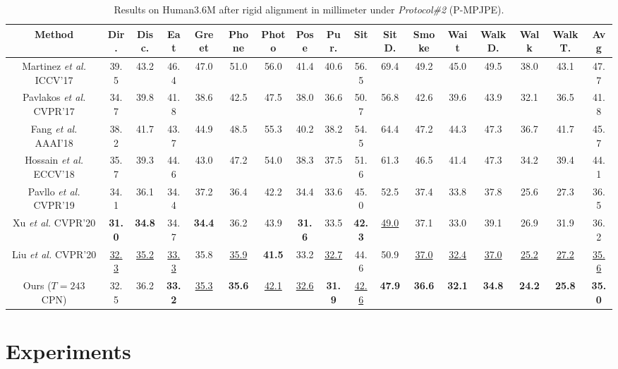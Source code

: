 \documentclass[sigconf]{acmart}
\begin{document}
\begin{table*}[ht]\small
  \centering
  \renewcommand\tabcolsep{4.0pt}
  \caption{Results on Human3.6M after rigid alignment in millimeter under \textit{Protocol\#2} (P-MPJPE).  }
\begin{tabular}{c|ccccccccccccccc|c}
    \toprule
    Method & Dir. & Disc. & Eat & Greet & Phone & Photo & Pose & Pur. & Sit & SitD. & Smoke & Wait & WalkD. & Walk & WalkT. & Avg \\
    \midrule
    Martinez \textit{et al.} \cite{martinez2017simple} ICCV'17& 39.5&43.2&46.4&47.0&51.0&56.0&41.4&40.6&56.5&69.4&49.2&45.0&49.5&38.0&43.1&47.7 \\
    Pavlakos \textit{et al.} \cite{pavlakos2017coarse} CVPR'17& 34.7&39.8&41.8&38.6&42.5&47.5&38.0&36.6&50.7&56.8&42.6&39.6&43.9&32.1&36.5&41.8 \\
    Fang \textit{et al.} \cite{fang2018learning} AAAI'18& 38.2&41.7&43.7&44.9&48.5&55.3&40.2&38.2&54.5&64.4&47.2&44.3&47.3&36.7&41.7&45.7 \\
    Hossain \textit{et al.} \cite{hossain2018exploiting} ECCV'18& 35.7&39.3&44.6&43.0&47.2&54.0&38.3&37.5&51.6&61.3&46.5&41.4&47.3&34.2&39.4&44.1 \\
    Pavllo \textit{et al.} \cite{jllo20193d} CVPR'19& 34.1&36.1&34.4&37.2&36.4&42.2&34.4&33.6&45.0&52.5&37.4&33.8&37.8&25.6&27.3&36.5 \\
    Xu \textit{et al.} \cite{xu2020deep} CVPR'20
    &\textbf{31.0}&\textbf{34.8}&34.7&\textbf{34.4}&36.2&43.9&\textbf{31.6}&33.5&\textbf{42.3}&\underline{49.0}&37.1&33.0&39.1&26.9&31.9&36.2\\
    Liu \textit{et al.} \cite{liu2020attention} CVPR'20& \underline{32.3}&\underline{35.2}&\underline{33.3}&35.8&\underline{35.9}&\textbf{41.5}&33.2&\underline{32.7}&44.6&50.9&\underline{37.0}&\underline{32.4}&\underline{37.0}&\underline{25.2}&\underline{27.2}&\underline{35.6} \\


    \midrule
    Ours ($T=243$ CPN) & 32.5&36.2&\textbf{33.2}&\underline{35.3}&\textbf{35.6}&\underline{42.1}&\underline{32.6}&\textbf{31.9}&\underline{42.6}&\textbf{47.9}&\textbf{36.6}&\textbf{32.1}&\textbf{34.8}&\textbf{24.2}&\textbf{25.8}&\textbf{35.0} \\
    \bottomrule
    \end{tabular}
    \vspace{-0.3cm}
  \label{tab2}
\end{table*}

\section{Experiments}
\end{document}
